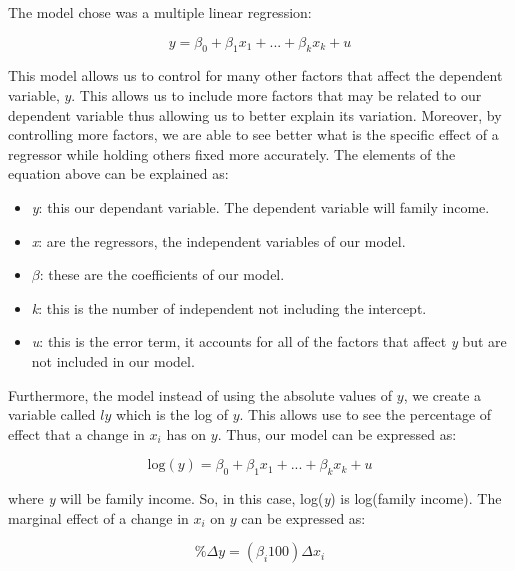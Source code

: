 \documentclass[12pt]{article}
\begin{document}
\begin{spacing}{1.5}

The model chose was a multiple linear regression:

\begin{equation}
	y = {\beta}_{0} + {\beta}_{1} {x}_{1} + ... + {\beta}_{k} {x}_{k} + u
\end{equation}

This model allows us to control for many other factors that affect the dependent variable, $ y $. This allows us to include more factors that may be related to our dependent variable thus allowing us to better explain its variation. Moreover, by controlling more factors, we are able to see better what is the specific effect of a regressor while holding others fixed more accurately. The elements of the equation above can be explained as:

\begin{itemize}
	\item \textit{y}: this our dependant variable. The dependent variable will family income.
	\item \textit{x}: are the regressors, the independent variables of our model.
	\item $ \beta $: these are the coefficients of our model.
	\item \textit{k}: this is the number of independent not including the intercept.
	\item \textit{u}: this is the error term, it accounts for all of the factors that affect \textit{y} but are not included in our model.
\end{itemize}

Furthermore, the model instead of using the absolute values of $ y $, we create a variable called $ ly $ which is the log of $ y $. This allows use to see the percentage of effect that a change in $ x_i $ has on $ y $. Thus, our model can be expressed as:

\begin{equation}
	\mbox{log}(y) = {\beta}_{0} + {\beta}_{1} {x}_{1} + ... + {\beta}_{k} {x}_{k} + u
\end{equation}

where \textit{y} will be family income. So, in this case, log(\textit{y}) is log(family income). The marginal effect of a change in $ {x}_{i} $ on $ y $ can be expressed as:

\begin{equation}
	\% \Delta y = ({\beta}_{i} 100) \Delta {x}_{i}
\end{equation}


\end{spacing}
\end{document}
